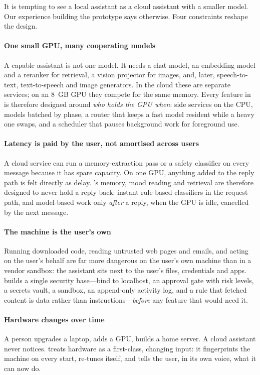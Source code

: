 It is tempting to see a local assistant as a cloud assistant with a smaller model. Our experience building the prototype says otherwise. Four constraints reshape the design.

\paragraph{One small GPU, many cooperating models} A capable assistant is not one model. It needs a chat model, an embedding model and a reranker for retrieval, a vision projector for images, and, later, speech-to-text, text-to-speech and image generators. In the cloud these are separate services; on an 8~GB GPU they compete for the same memory. Every feature in \hivi{} is therefore designed around \emph{who holds the GPU when}: side services on the CPU, models batched by phase, a router that keeps a fast model resident while a heavy one swaps, and a scheduler that pauses background work for foreground use.

\paragraph{Latency is paid by the user, not amortised across users} A cloud service can run a memory-extraction pass or a safety classifier on every message because it has spare capacity. On one GPU, anything added to the reply path is felt directly as delay. \hivi{}'s memory, mood reading and retrieval are therefore designed to never hold a reply back: instant rule-based classifiers in the request path, and model-based work only \emph{after} a reply, when the GPU is idle, cancelled by the next message.

\paragraph{The machine is the user's own} Running downloaded code, reading untrusted web pages and emails, and acting on the user's behalf are far more dangerous on the user's own machine than in a vendor sandbox: the assistant sits next to the user's files, credentials and apps. \hivi{} builds a single security base---bind to localhost, an approval gate with risk levels, a secrets vault, a sandbox, an append-only activity log, and a rule that fetched content is data rather than instructions---\emph{before} any feature that would need it.

\paragraph{Hardware changes over time} A person upgrades a laptop, adds a GPU, builds a home server. A cloud assistant never notices. \hivi{} treats hardware as a first-class, changing input: it fingerprints the machine on every start, re-tunes itself, and tells the user, in its own voice, what it can now do.

